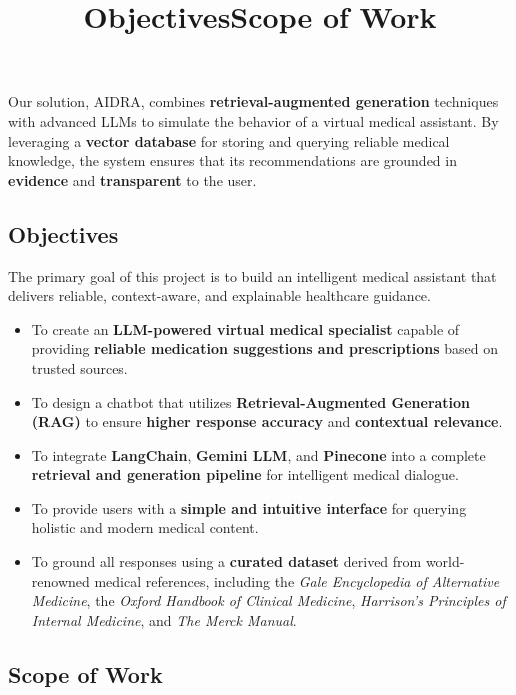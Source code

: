 \documentclass[12pt,a4paper]{report}
\newcommand{\titleKey}{AIDRA}
\begin{document}
Our solution, \titleKey, combines \textbf{retrieval-augmented generation} techniques with advanced LLMs to simulate the behavior of a virtual medical assistant. By leveraging a \textbf{vector database} for storing and querying reliable medical knowledge, the system ensures that its recommendations are grounded in \textbf{evidence} and \textbf{transparent} to the user.
 
 
 
\title{Objectives}
\subsection{Objectives}  
The primary goal of this project is to build an intelligent medical assistant that delivers reliable, context-aware, and explainable healthcare guidance.

\begin{itemize}
    \item To create an \textbf{LLM-powered virtual medical specialist} capable of providing \textbf{reliable medication suggestions and prescriptions} based on trusted sources.
    
    \item To design a chatbot that utilizes \textbf{Retrieval-Augmented Generation (RAG)} to ensure \textbf{higher response accuracy} and \textbf{contextual relevance}.
    
    \item To integrate \textbf{LangChain}, \textbf{Gemini LLM}, and \textbf{Pinecone} into a complete \textbf{retrieval and generation pipeline} for intelligent medical dialogue.
    
    \item To provide users with a \textbf{simple and intuitive interface} for querying holistic and modern medical content.
    
    \item To ground all responses using a \textbf{curated dataset} derived from world-renowned medical references, including the \textit{Gale Encyclopedia of Alternative Medicine}, the \textit{Oxford Handbook of Clinical Medicine}, \textit{Harrison’s Principles of Internal Medicine}, and \textit{The Merck Manual}.
\end{itemize}




\title{Scope of Work}
\subsection{Scope of Work}
\end{document}
